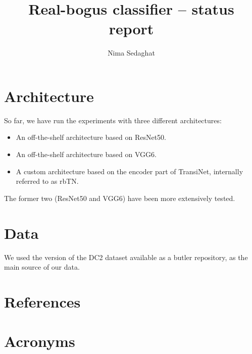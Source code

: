 \documentclass[DM,authoryear,toc]{lsstdoc}
\title{Real-bogus classifier -- status report}
\author{%
Nima Sedaghat
}
\date{\vcsDate}
\begin{document}
\maketitle


\section{Architecture}
So far, we have run the experiments with three different architectures:

\begin{itemize}
\item{An off-the-shelf architecture based on ResNet50.}
\item{An off-the-shelf architecture based on VGG6.}
\item{A custom architecture based on the encoder part of TransiNet, internally referred to as rbTN}.
\end{itemize}

The former two (ResNet50 and VGG6) have been more extensively tested.

\section{Data}
We used the version of the DC2 dataset available as a butler repository, as the main source of our data.



\appendix
\section{References} \label{sec:bib}
\renewcommand{\refname}{} %


\section{Acronyms} \label{sec:acronyms}

\end{document}
